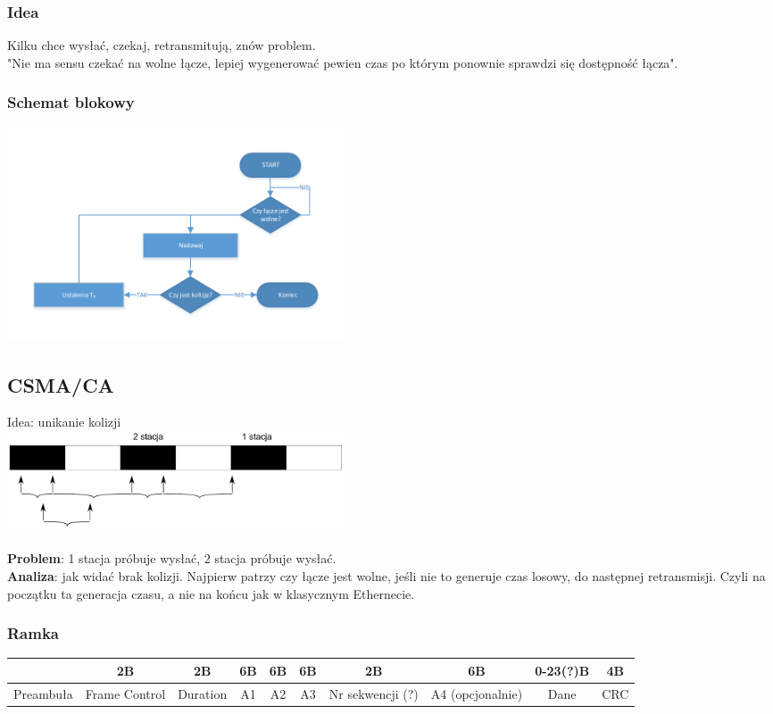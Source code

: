 			\subsubsection{Idea}
				Kilku chce wysłać, czekaj, retransmitują, znów problem.\\
				"Nie ma sensu czekać na wolne łącze, lepiej wygenerować pewien czas po którym ponownie sprawdzi się dostępność łącza".
			\subsubsection{Schemat blokowy}
				\includegraphics[width=10cm]{./images/image21.pdf}
		\subsection{CSMA/CA}
			Idea: unikanie kolizji\\
			\includegraphics[width=10cm]{./images/image22.pdf}\\\\
			\textbf{Problem}: 1 stacja próbuje wysłać, 2 stacja próbuje wysłać.\\
			\textbf{Analiza}: jak widać brak kolizji. Najpierw patrzy czy łącze jest wolne, jeśli nie to generuje czas losowy, do następnej retransmisji. Czyli na początku ta generacja czasu, a nie na końcu jak w klasycznym Ethernecie.
		\subsubsection{Ramka}
			\begin{tabular}{|c|c|c|c|c|c|c|c|c|c|}
				\hline  & 2B & 2B & 6B & 6B & 6B & 2B & 6B & 0-23(?)B & 4B \\ 
				\hline Preambuła & Frame Control & Duration & A1 & A2 & A3 & Nr sekwencji (?) & A4 (opcjonalnie) & Dane & CRC \\ 
				\hline 
			\end{tabular}
